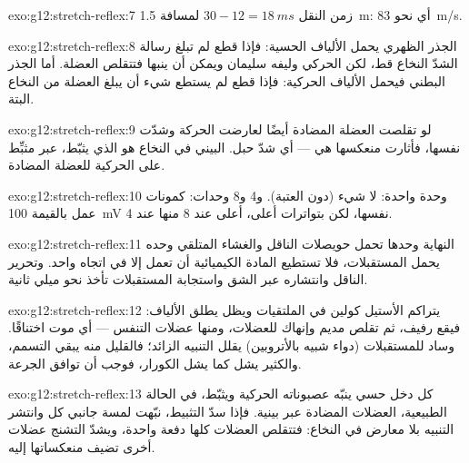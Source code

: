 \begin{solution}{exo:g12:stretch-reflex:7}
زمن النقل $30 - 12 = \qty{18}{ms}$ لمسافة \qty{1.5}{m}: أي نحو
\qty{83}{m/s}.
\end{solution}

\begin{solution}{exo:g12:stretch-reflex:8}
الجذر الظهري يحمل الألياف الحسية: فإذا قطع لم تبلغ رسالة الشدّ النخاع
قط، لكن  الحركي وليفه سليمان ويمكن أن ينبها فتتقلص العضلة. أما
الجذر البطني فيحمل الألياف الحركية: فإذا قطع لم يستطع شيء أن يبلغ
العضلة من النخاع البتة.
\end{solution}

\begin{solution}{exo:g12:stretch-reflex:9}
لو تقلصت العضلة المضادة أيضًا لعارضت الحركة وشدّت نفسها، فأثارت منعكسها
هي --- أي شدّ حبل.  البيني في النخاع هو الذي يثبّط، عبر 
مثبِّط على  الحركية للعضلة المضادة.
\end{solution}

\begin{solution}{exo:g12:stretch-reflex:10}
وحدة واحدة: لا شيء (دون العتبة). و4 و8 وحدات: كمونات عمل بالقيمة
\qty{100}{mV} نفسها، لكن بتواترات أعلى، أعلى عند 8 منها عند 4.
\end{solution}

\begin{solution}{exo:g12:stretch-reflex:11}
النهاية وحدها تحمل حويصلات الناقل والغشاء المتلقي وحده يحمل
المستقبلات، فلا تستطيع المادة الكيميائية أن تعمل إلا في اتجاه واحد.
وتحرير الناقل وانتشاره عبر الشق واستجابة المستقبلات تأخذ نحو ميلي
ثانية.
\end{solution}

\begin{solution}{exo:g12:stretch-reflex:12}
يتراكم الأستيل كولين في الملتقيات ويظل يطلق الألياف: فيقع رفيف، ثم
تقلص مديم وإنهاك للعضلات، ومنها عضلات التنفس --- أي موت اختناقًا.
وساد للمستقبلات (دواء شبيه بالأتروبين) يقلل التنبيه الزائد؛ فالقليل
منه يبقي التسمم، والكثير يشل كما يشل الكورار، فوجب أن توافق الجرعة.
\end{solution}

\begin{solution}{exo:g12:stretch-reflex:13}
كل دخل حسي ينبّه عصبوناته الحركية ويثبّط، في الحالة الطبيعية، 
العضلات المضادة عبر  بينية. فإذا سدّ التثبيط، نبّهت لمسة جانبي
كل  وانتشر التنبيه بلا معارض في النخاع: فتتقلص العضلات كلها دفعة
واحدة، ويشدّ التشنج عضلات أخرى تضيف منعكساتها إليه.
\end{solution}

